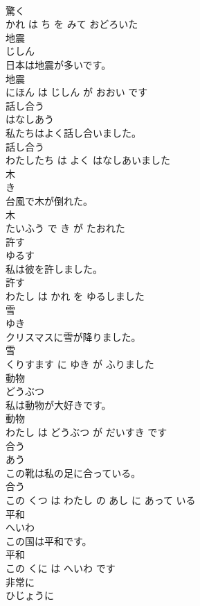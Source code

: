 \documentclass[8pt]{extreport}
\begin{document}
\begin{CJK}{UTF8}{min}
\\	驚く 
\\	かれ は ち を みて おどろいた			
\\	地震	
\\	じしん			
\\	日本は地震が多いです。	
\\	地震 
\\	にほん は じしん が おおい です			
\\	話し合う	
\\	はなしあう			
\\	私たちはよく話し合いました。	
\\	話し合う 
\\	わたしたち は よく はなしあいました			
\\	木	
\\	き			
\\	台風で木が倒れた。	
\\	木 
\\	たいふう で き が たおれた			
\\	許す	
\\	ゆるす			
\\	私は彼を許しました。	
\\	許す 
\\	わたし は かれ を ゆるしました			
\\	雪	
\\	ゆき			
\\	クリスマスに雪が降りました。	
\\	雪 
\\	くりすます に ゆき が ふりました			
\\	動物	
\\	どうぶつ			
\\	私は動物が大好きです。	
\\	動物 
\\	わたし は どうぶつ が だいすき です			
\\	合う	
\\	あう			
\\	この靴は私の足に合っている。	
\\	合う 
\\	この くつ は わたし の あし に あって いる			
\\	平和	
\\	へいわ			
\\	この国は平和です。	
\\	平和 
\\	この くに は へいわ です			
\\	非常に	
\\	ひじょうに			

\end{CJK}
\end{document}
